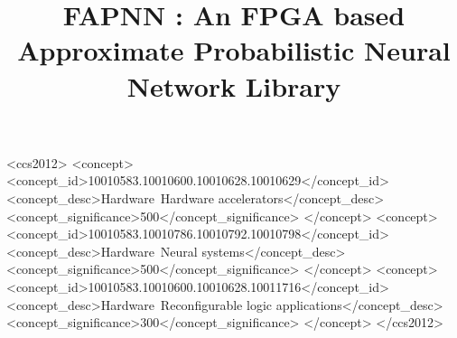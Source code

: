 \documentclass[sigconf]{acmart}
\begin{document}
\title{FAPNN : An FPGA based Approximate Probabilistic Neural Network Library}


%
%

\begin{CCSXML}
<ccs2012>
<concept>
<concept_id>10010583.10010600.10010628.10010629</concept_id>
<concept_desc>Hardware~Hardware accelerators</concept_desc>
<concept_significance>500</concept_significance>
</concept>
<concept>
<concept_id>10010583.10010786.10010792.10010798</concept_id>
<concept_desc>Hardware~Neural systems</concept_desc>
<concept_significance>500</concept_significance>
</concept>
<concept>
<concept_id>10010583.10010600.10010628.10011716</concept_id>
<concept_desc>Hardware~Reconfigurable logic applications</concept_desc>
<concept_significance>300</concept_significance>
</concept>
</ccs2012>
\end{CCSXML}






\maketitle









 
\end{document}
